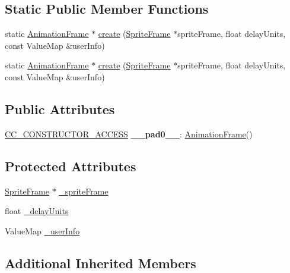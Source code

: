\subsection*{Static Public Member Functions}
\begin{DoxyCompactItemize}
\item 
static \hyperlink{classAnimationFrame}{Animation\+Frame} $\ast$ \hyperlink{classAnimationFrame_a2ccd019f2a26530692169bc1f186cdc7}{create} (\hyperlink{classSpriteFrame}{Sprite\+Frame} $\ast$sprite\+Frame, float delay\+Units, const Value\+Map \&user\+Info)
\item 
static \hyperlink{classAnimationFrame}{Animation\+Frame} $\ast$ \hyperlink{classAnimationFrame_aaeb400239c6201038598c921e044d498}{create} (\hyperlink{classSpriteFrame}{Sprite\+Frame} $\ast$sprite\+Frame, float delay\+Units, const Value\+Map \&user\+Info)
\end{DoxyCompactItemize}
\subsection*{Public Attributes}
\begin{DoxyCompactItemize}
\item 
\mbox{\label{classAnimationFrame_af2b6fae6f4e0d06cd1cf46018709c4c7}} 
\hyperlink{_2cocos2d_2cocos_2base_2ccConfig_8h_a25ef1314f97c35a2ed3d029b0ead6da0}{C\+C\+\_\+\+C\+O\+N\+S\+T\+R\+U\+C\+T\+O\+R\+\_\+\+A\+C\+C\+E\+SS} {\bfseries \+\_\+\+\_\+pad0\+\_\+\+\_\+}\+: \hyperlink{classAnimationFrame}{Animation\+Frame}()
\end{DoxyCompactItemize}
\subsection*{Protected Attributes}
\begin{DoxyCompactItemize}
\item 
\hyperlink{classSpriteFrame}{Sprite\+Frame} $\ast$ \hyperlink{classAnimationFrame_a539b2ce4748dfeae15578c3317b9faf2}{\+\_\+sprite\+Frame}
\item 
float \hyperlink{classAnimationFrame_a99ce553eb8cd4befb0a5e994edb19a17}{\+\_\+delay\+Units}
\item 
Value\+Map \hyperlink{classAnimationFrame_aa7df71ae7201b786d7c264adb6a595b3}{\+\_\+user\+Info}
\end{DoxyCompactItemize}
\subsection*{Additional Inherited Members}


